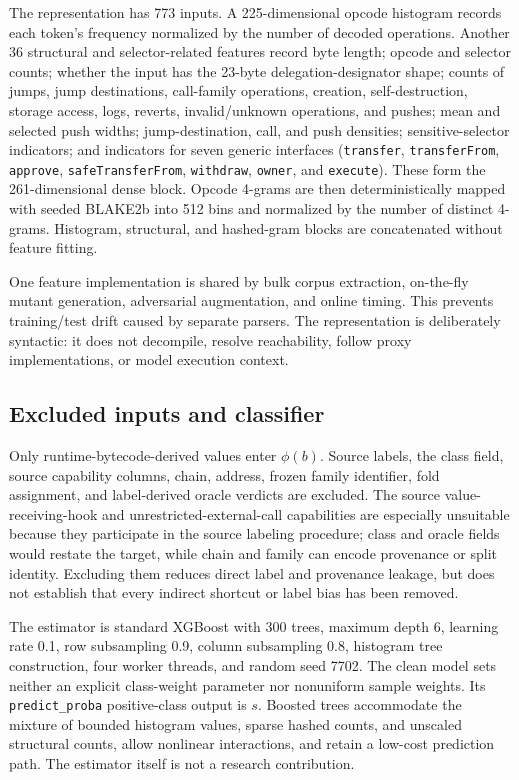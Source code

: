 The representation has 773 inputs. A 225-dimensional opcode histogram records each token's frequency normalized by the number of decoded operations. Another 36 structural and selector-related features record byte length; opcode and selector counts; whether the input has the 23-byte delegation-designator shape; counts of jumps, jump destinations, call-family operations, creation, self-destruction, storage access, logs, reverts, invalid/unknown operations, and pushes; mean and selected push widths; jump-destination, call, and push densities; sensitive-selector indicators; and indicators for seven generic interfaces (\texttt{transfer}, \texttt{transferFrom}, \texttt{approve}, \texttt{safeTransferFrom}, \texttt{withdraw}, \texttt{owner}, and \texttt{execute}). These form the 261-dimensional dense block. Opcode 4-grams are then deterministically mapped with seeded BLAKE2b into 512 bins and normalized by the number of distinct 4-grams. Histogram, structural, and hashed-gram blocks are concatenated without feature fitting.

One feature implementation is shared by bulk corpus extraction, on-the-fly mutant generation, adversarial augmentation, and online timing. This prevents training/test drift caused by separate parsers. The representation is deliberately syntactic: it does not decompile, resolve reachability, follow proxy implementations, or model execution context.

\subsection{Excluded inputs and classifier}

Only runtime-bytecode-derived values enter $\phi(b)$. Source labels, the class field, source capability columns, chain, address, frozen family identifier, fold assignment, and label-derived oracle verdicts are excluded. The source value-receiving-hook and unrestricted-external-call capabilities are especially unsuitable because they participate in the source labeling procedure; class and oracle fields would restate the target, while chain and family can encode provenance or split identity. Excluding them reduces direct label and provenance leakage, but does not establish that every indirect shortcut or label bias has been removed.

The estimator is standard XGBoost with 300 trees, maximum depth 6, learning rate 0.1, row subsampling 0.9, column subsampling 0.8, histogram tree construction, four worker threads, and random seed 7702. The clean model sets neither an explicit class-weight parameter nor nonuniform sample weights. Its \texttt{predict\_proba} positive-class output is $s$. Boosted trees accommodate the mixture of bounded histogram values, sparse hashed counts, and unscaled structural counts, allow nonlinear interactions, and retain a low-cost prediction path. The estimator itself is not a research contribution.

